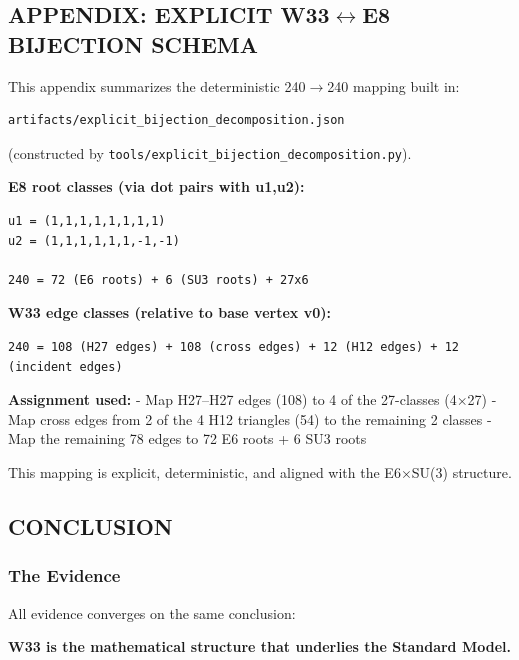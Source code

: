 \documentclass[11pt]{article}
\begin{document}
\subsection{\texorpdfstring{APPENDIX: EXPLICIT
W33\ensuremath{\leftrightarrow}E8 BIJECTION
SCHEMA}{APPENDIX: EXPLICIT W33E8 BIJECTION SCHEMA}}\label{appendix-explicit-w33e8-bijection-schema}

This appendix summarizes the deterministic
240\ensuremath{\rightarrow}240 mapping built in:

\begin{verbatim}
artifacts/explicit_bijection_decomposition.json
\end{verbatim}

(constructed by \texttt{tools/explicit\_bijection\_decomposition.py}).

\textbf{E8 root classes (via dot pairs with u1,u2):}

\begin{verbatim}
u1 = (1,1,1,1,1,1,1,1)
u2 = (1,1,1,1,1,1,-1,-1)

240 = 72 (E6 roots) + 6 (SU3 roots) + 27x6
\end{verbatim}

\textbf{W33 edge classes (relative to base vertex v0):}

\begin{verbatim}
240 = 108 (H27 edges) + 108 (cross edges) + 12 (H12 edges) + 12 (incident edges)
\end{verbatim}

\textbf{Assignment used:} - Map H27--H27 edges (108) to 4 of the
27-classes (4\ensuremath{\times}27) - Map cross edges from 2 of the 4
H12 triangles (54) to the remaining 2 classes - Map the remaining 78
edges to 72 E6 roots + 6 SU3 roots

This mapping is explicit, deterministic, and aligned with the
E6\ensuremath{\times}SU(3) structure.

\subsection{CONCLUSION}\label{conclusion}

\subsubsection{The Evidence}\label{the-evidence}

All evidence converges on the same conclusion:

\textbf{W33 is the mathematical structure that underlies the Standard
Model.}
\end{document}
